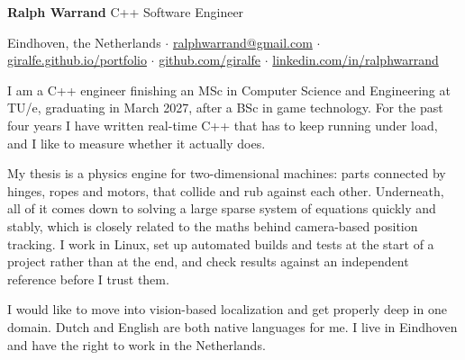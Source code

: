 \documentclass[10pt,a4paper]{article}
\begin{document}
{\LARGE\bfseries Ralph Warrand}\hfill{\large\color{accent} C++ Software Engineer}\par
\vspace{3pt}
{\small\textcolor{muted}{Eindhoven, the Netherlands $\cdot$
\href{mailto:ralphwarrand@gmail.com}{ralphwarrand@gmail.com} $\cdot$
\href{https://giralfe.github.io/portfolio/}{giralfe.github.io/portfolio} $\cdot$
\href{https://github.com/giralfe}{github.com/giralfe} $\cdot$
\href{https://linkedin.com/in/ralphwarrand}{linkedin.com/in/ralphwarrand}}}
\vspace{6pt}

I am a C++ engineer finishing an MSc in Computer Science and Engineering at TU/e, graduating in March 2027, after a BSc in game technology. For the past four years I have written real-time C++ that has to keep running under load, and I like to measure whether it actually does.

\vspace{4pt}
My thesis is a physics engine for two-dimensional machines: parts connected by hinges, ropes and motors, that collide and rub against each other. Underneath, all of it comes down to solving a large sparse system of equations quickly and stably, which is closely related to the maths behind camera-based position tracking. I work in Linux, set up automated builds and tests at the start of a project rather than at the end, and check results against an independent reference before I trust them.

\vspace{4pt}
I would like to move into vision-based localization and get properly deep in one domain. Dutch and English are both native languages for me. I live in Eindhoven and have the right to work in the Netherlands.
\vspace{2pt}

\end{document}
